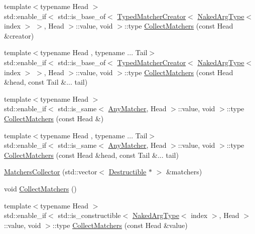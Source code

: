 \begin{DoxyCompactItemize}
\item 
{\footnotesize template$<$typename Head $>$ }\\std\+::enable\+\_\+if$<$ std\+::is\+\_\+base\+\_\+of$<$ \mbox{\hyperlink{structfakeit_1_1TypedMatcherCreator}{Typed\+Matcher\+Creator}}$<$ \mbox{\hyperlink{classfakeit_1_1MatchersCollector_aeda8ced6a2f0cb7c6e4f916f18a91730}{Naked\+Arg\+Type}}$<$ index $>$ $>$, Head $>$\+::value, void $>$\+::type \mbox{\hyperlink{classfakeit_1_1MatchersCollector_ae954aa74286bcd096169067f5e897356}{Collect\+Matchers}} (const Head \&creator)
\item 
{\footnotesize template$<$typename Head , typename ... Tail$>$ }\\std\+::enable\+\_\+if$<$ std\+::is\+\_\+base\+\_\+of$<$ \mbox{\hyperlink{structfakeit_1_1TypedMatcherCreator}{Typed\+Matcher\+Creator}}$<$ \mbox{\hyperlink{classfakeit_1_1MatchersCollector_aeda8ced6a2f0cb7c6e4f916f18a91730}{Naked\+Arg\+Type}}$<$ index $>$ $>$, Head $>$\+::value, void $>$\+::type \mbox{\hyperlink{classfakeit_1_1MatchersCollector_a40994e9802e933fb1bae91870d666dcb}{Collect\+Matchers}} (const Head \&head, const Tail \&... tail)
\item 
{\footnotesize template$<$typename Head $>$ }\\std\+::enable\+\_\+if$<$ std\+::is\+\_\+same$<$ \mbox{\hyperlink{structfakeit_1_1AnyMatcher}{Any\+Matcher}}, Head $>$\+::value, void $>$\+::type \mbox{\hyperlink{classfakeit_1_1MatchersCollector_a89350af9ba2e7aaead8bd7b007f03631}{Collect\+Matchers}} (const Head \&)
\item 
{\footnotesize template$<$typename Head , typename ... Tail$>$ }\\std\+::enable\+\_\+if$<$ std\+::is\+\_\+same$<$ \mbox{\hyperlink{structfakeit_1_1AnyMatcher}{Any\+Matcher}}, Head $>$\+::value, void $>$\+::type \mbox{\hyperlink{classfakeit_1_1MatchersCollector_a5bc97a3d729b1bb67e372181ad88b77d}{Collect\+Matchers}} (const Head \&head, const Tail \&... tail)
\item 
\mbox{\hyperlink{classfakeit_1_1MatchersCollector_ac5e0254e23626d189f329de8051137a6}{Matchers\+Collector}} (std\+::vector$<$ \mbox{\hyperlink{classfakeit_1_1Destructible}{Destructible}} $\ast$ $>$ \&matchers)
\item 
void \mbox{\hyperlink{classfakeit_1_1MatchersCollector_a2d9a08a347c3915daa33f307a274f13c}{Collect\+Matchers}} ()
\item 
{\footnotesize template$<$typename Head $>$ }\\std\+::enable\+\_\+if$<$ std\+::is\+\_\+constructible$<$ \mbox{\hyperlink{classfakeit_1_1MatchersCollector_aeda8ced6a2f0cb7c6e4f916f18a91730}{Naked\+Arg\+Type}}$<$ index $>$, Head $>$\+::value, void $>$\+::type \mbox{\hyperlink{classfakeit_1_1MatchersCollector_affd243a89f758239d77c70dce6318087}{Collect\+Matchers}} (const Head \&value)

\end{DoxyCompactItemize}
